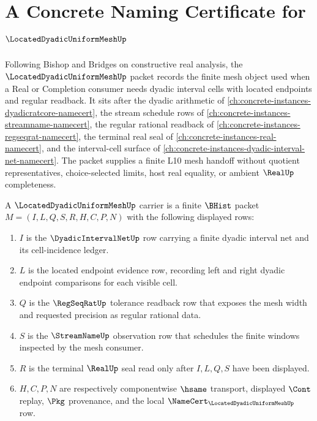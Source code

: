 \chapter{A Concrete Naming Certificate for $\LocatedDyadicUniformMeshUp$}
\label{ch:concrete-instances-located-dyadic-uniform-mesh-namecert}

Following Bishop and Bridges on constructive real analysis, the $\LocatedDyadicUniformMeshUp$ packet records the finite mesh object used when a Real or Completion consumer needs dyadic interval cells with located endpoints and regular readback. It sits after the dyadic arithmetic of \autoref{ch:concrete-instances-dyadicratcore-namecert}, the stream schedule rows of \autoref{ch:concrete-instances-streamname-namecert}, the regular rational readback of \autoref{ch:concrete-instances-regseqrat-namecert}, the terminal real seal of \autoref{ch:concrete-instances-real-namecert}, and the interval-cell surface of \autoref{ch:concrete-instances-dyadic-interval-net-namecert}. The packet supplies a finite L10 mesh handoff without quotient representatives, choice-selected limits, host real equality, or ambient $\RealUp$ completeness.

\begin{definition}
\label{def:located-dyadic-uniform-mesh-carrier}
A $\LocatedDyadicUniformMeshUp$ carrier is a finite $\BHist$ packet $M=(I,L,Q,S,R,H,C,P,N)$ with the following displayed rows:
\begin{enumerate}
\item $I$ is the $\DyadicIntervalNetUp$ row carrying a finite dyadic interval net and its cell-incidence ledger.
\item $L$ is the located endpoint evidence row, recording left and right dyadic endpoint comparisons for each visible cell.
\item $Q$ is the $\RegSeqRatUp$ tolerance readback row that exposes the mesh width and requested precision as regular rational data.
\item $S$ is the $\StreamNameUp$ observation row that schedules the finite windows inspected by the mesh consumer.
\item $R$ is the terminal $\RealUp$ seal read only after $I,L,Q,S$ have been displayed.
\item $H,C,P,N$ are respectively componentwise $\hsame$ transport, displayed $\Cont$ replay, $\Pkg$ provenance, and the local $\NameCert_{\LocatedDyadicUniformMeshUp}$ row.
\end{enumerate}
\end{definition}

